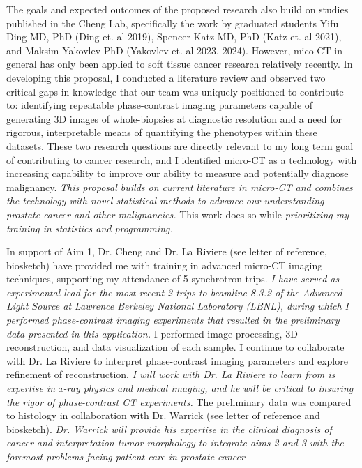 \documentclass{NIHGrant}
\begin{document}
The goals and expected outcomes of the proposed research also build on studies published in the Cheng Lab, specifically the work by graduated students Yifu Ding MD, PhD (Ding et. al 2019), Spencer Katz MD, PhD (Katz et. al 2021), and Maksim Yakovlev PhD (Yakovlev et. al 2023, 2024). However, mico-CT in general has only been applied to soft tissue cancer research relatively recently. In developing this proposal, I conducted a literature review and observed two critical gaps in knowledge that our team was uniquely positioned to contribute to: identifying repeatable phase-contrast imaging parameters capable of generating 3D images of whole-biopsies at diagnostic resolution and a need for rigorous, interpretable means of quantifying the phenotypes within these datasets. These two research questions are directly relevant to my long term goal of contributing to cancer research, and I identified micro-CT as a technology with increasing capability to improve our ability to measure and potentially diagnose malignancy. \emph{This proposal builds on current literature in micro-CT and combines the technology with novel statistical methods to advance our understanding prostate cancer and other malignancies.} This work does so while \emph{prioritizing my training in statistics and programming.}

In support of Aim 1, Dr. Cheng and Dr. La Riviere (see letter of reference, biosketch) have provided me with training in advanced micro-CT imaging techniques, supporting my attendance of 5 synchrotron trips. \emph{I have served as experimental lead for the most recent 2 trips to beamline 8.3.2 of the Advanced Light Source at Lawrence Berkeley National Laboratory (LBNL), during which I performed phase-contrast imaging experiments that resulted in the preliminary data presented in this application.} I performed image processing, 3D reconstruction, and data visualization of each sample. I continue to collaborate with Dr. La Riviere to interpret phase-contrast imaging parameters and explore refinement of reconstruction. \emph{I will work with Dr. La Riviere to learn from is expertise in x-ray physics and medical imaging, and he will be critical to insuring the rigor of phase-contrast CT experiments.} The preliminary data was compared to histology in collaboration with Dr. Warrick (see letter of reference and biosketch). \emph{Dr. Warrick will provide his expertise in the clinical diagnosis of cancer and interpretation tumor morphology to integrate aims 2 and 3 with the foremost problems facing patient care in prostate cancer}
\end{document}
